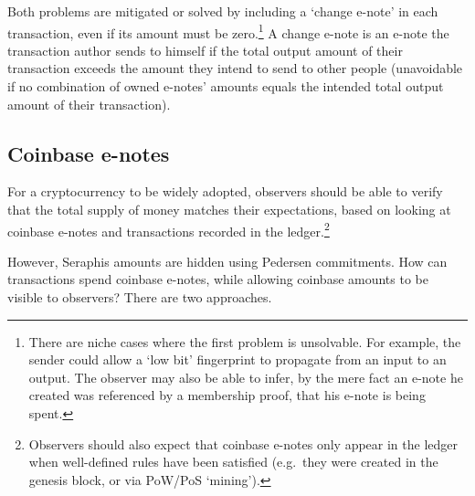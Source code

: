 Both problems are mitigated or solved by including a `change e-note' in each transaction, even if its amount must be zero.\footnote{There are niche cases where the first problem is unsolvable. For example, the sender could allow a `low bit' fingerprint to propagate from an input to an output. The observer may also be able to infer, by the mere fact an e-note he created was referenced by a membership proof, that his e-note is being spent.} A change e-note is an e-note the transaction author sends to himself if the total output amount of their transaction exceeds the amount they intend to send to other people (unavoidable if no combination of owned e-notes' amounts equals the intended total output amount of their transaction).


\subsection{Coinbase e-notes}
\label{subsec:implementers-coinbase-enotes}

For a cryptocurrency to be widely adopted, observers should be able to verify that the total supply of money matches their expectations, based on looking at coinbase e-notes and transactions recorded in the ledger.\footnote{Observers should also expect that coinbase e-notes only appear in the ledger when well-defined rules have been satisfied (e.g.\ they were created in the genesis block, or via PoW/PoS `mining').}

However, Seraphis amounts are hidden using Pedersen commitments. How can transactions spend coinbase e-notes, while allowing coinbase amounts to be visible to observers? There are two approaches.

